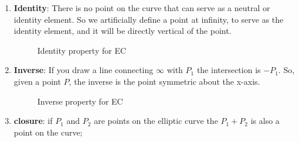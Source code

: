 \begin{enumerate}[1.]
\item \textbf{Identity}: There is no point on the curve that can serve as a neutral or identity element.  So we artificially define a point at infinity, to serve as the identity element, and it will be directly vertical of the point. 
\begin{figure}[H]
	  \caption{\label{fig:DH:DHKE_13} Identity property for EC}
\end{figure}
\item \textbf{Inverse}: If you draw a line connecting $\infty$ with $P_1$ the intersection is $-P_1$. So, given a point $P$, the inverse is the point symmetric about the x-axis. 
\begin{figure}[H]
	  \caption{\label{fig:DH:DHKE_14} Inverse property for EC }
\end{figure}
\item \textbf{closure}: if $P_1$ and $P_2$ are points on the elliptic curve the $P_1 + P_2$ is also a point on the curve;

\end{enumerate}
